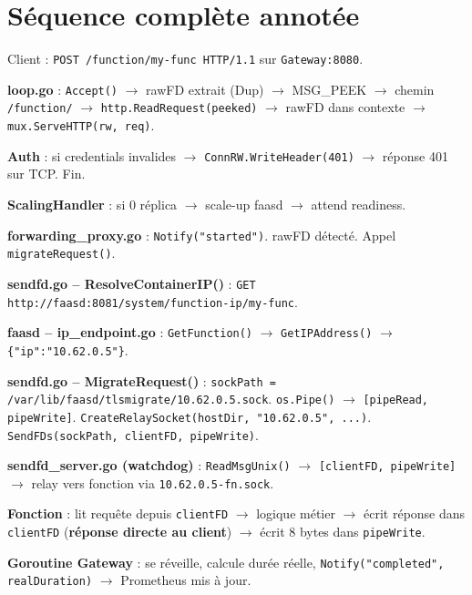 \documentclass[11pt,a4paper]{article}
\begin{document}
\section{Séquence complète annotée}

\begin{enumerate}[label=\textbf{[\arabic*]}, leftmargin=*]
  \item Client : \texttt{POST /function/my-func HTTP/1.1} sur \texttt{Gateway:8080}.
  \item \textbf{loop.go} : \texttt{Accept()} $\to$ rawFD extrait (Dup) $\to$ MSG\_PEEK $\to$
    chemin \texttt{/function/} $\to$ \texttt{http.ReadRequest(peeked)} $\to$ rawFD dans
    contexte $\to$ \texttt{mux.ServeHTTP(rw, req)}.
  \item \textbf{Auth} : si credentials invalides $\to$ \texttt{ConnRW.WriteHeader(401)} $\to$
    réponse 401 sur TCP. Fin.
  \item \textbf{ScalingHandler} : si 0 réplica $\to$ scale-up faasd $\to$ attend readiness.
  \item \textbf{forwarding\_proxy.go} : \texttt{Notify("started")}. rawFD détecté.
    Appel \texttt{migrateRequest()}.
  \item \textbf{sendfd.go -- ResolveContainerIP()} :
    \texttt{GET http://faasd:8081/system/function-ip/my-func}.
  \item \textbf{faasd -- ip\_endpoint.go} :
    \texttt{GetFunction()} $\to$ \texttt{GetIPAddress()} $\to$ \texttt{\{"ip":"10.62.0.5"\}}.
  \item \textbf{sendfd.go -- MigrateRequest()} :
    \texttt{sockPath = /var/lib/faasd/tlsmigrate/10.62.0.5.sock}.
    \texttt{os.Pipe()} $\to$ \texttt{[pipeRead, pipeWrite]}.
    \texttt{CreateRelaySocket(hostDir, "10.62.0.5", ...)}.
    \texttt{SendFDs(sockPath, clientFD, pipeWrite)}.
  \item \textbf{sendfd\_server.go (watchdog)} : \texttt{ReadMsgUnix()} $\to$
    \texttt{[clientFD, pipeWrite]} $\to$ relay vers fonction via \texttt{10.62.0.5-fn.sock}.
  \item \textbf{Fonction} : lit requête depuis \texttt{clientFD} $\to$ logique métier $\to$
    écrit réponse dans \texttt{clientFD} (\textbf{réponse directe au client}) $\to$
    écrit 8 bytes dans \texttt{pipeWrite}.
  \item \textbf{Goroutine Gateway} : se réveille, calcule durée réelle,
    \texttt{Notify("completed", realDuration)} $\to$ Prometheus mis à jour.
\end{enumerate}
\end{document}
